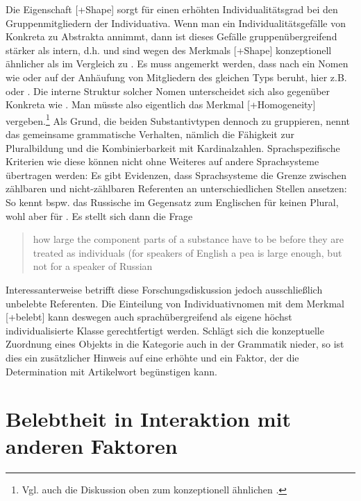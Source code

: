 Die Eigenschaft [+Shape] sorgt für einen erhöhten Individualitätsgrad  bei den Gruppenmitgliedern der Individuativa. Wenn man ein Individualitätsgefälle  von Konkreta  zu Abstrakta  annimmt, dann ist dieses Gefälle gruppenübergreifend stärker als intern, d.h.  und  sind wegen des Merkmals [+Shape] konzeptionell ähnlicher als  im Vergleich zu  . Es muss angemerkt werden, dass nach \textcite{Rijkhoff2002} ein Nomen wie  oder  auf der Anhäufung von Mitgliedern des gleichen Typs beruht, hier z.B.  oder . Die interne Struktur solcher Nomen unterscheidet sich also gegenüber  Konkreta  wie . Man müsste also eigentlich das Merkmal [+Homogeneity] vergeben.\footnote{Vgl. auch die Diskussion oben zum konzeptionell ähnlichen .} Als Grund, die beiden Substantivtypen  dennoch zu gruppieren, nennt \textcite[103]{Zifonun2012}  das gemeinsame grammatische Verhalten, nämlich die Fähigkeit zur Pluralbildung  und die Kombinierbarkeit mit Kardinalzahlen. Sprachspezifische Kriterien wie diese können nicht ohne Weiteres auf andere Sprachsysteme übertragen werden:  Es gibt Evidenzen, dass Sprachsysteme die Grenze zwischen zählbaren und nicht-zählbaren Referenten an unterschiedlichen Stellen ansetzen: So kennt bspw. das Russische im Gegensatz zum Englischen für  keinen  Plural, wohl aber für  \parencite[80]{Corbett2000}. Es stellt sich dann die Frage \blockcquote[80]{Corbett2000}{how large the component parts of a substance have to be before they are treated as individuals (for speakers of English a pea is large enough, but not for a speaker of Russian}. Interessanterweise betrifft diese Forschungsdiskussion jedoch ausschließlich unbelebte  Referenten. Die Einteilung von Individuativnomen mit dem Merkmal [+belebt] kann deswegen auch sprachübergreifend als eigene höchst individualisierte Klasse gerechtfertigt werden. Schlägt sich die konzeptuelle Zuordnung eines Objekts in die Kategorie  auch in der Grammatik nieder, so ist dies ein zusätzlicher Hinweis auf eine erhöhte  und ein Faktor, der die Determination mit Artikelwort begünstigen kann. 

\section{Belebtheit in Interaktion mit anderen Faktoren} \label{sec:andere-kog}
 
